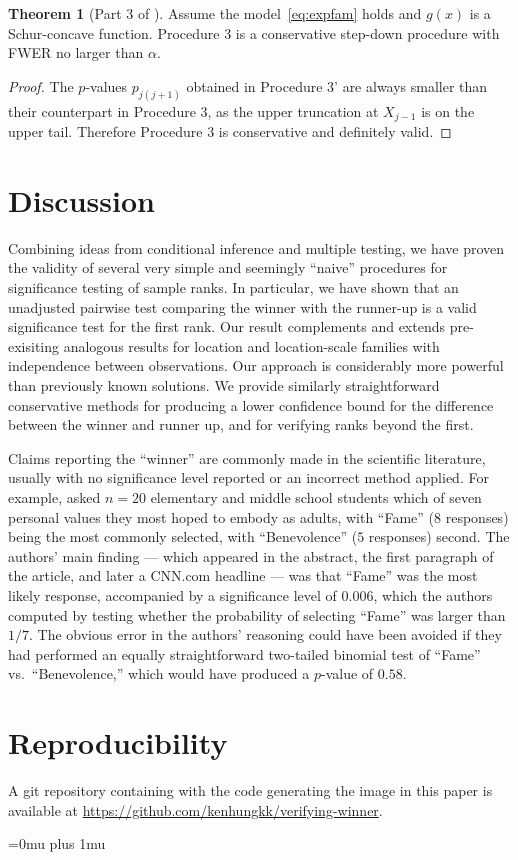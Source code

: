 \documentclass[11pt]{article}
\theoremstyle{definition}
\theoremstyle{custom}
\newtheorem*{customthm}{Theorem}
\begin{document}
\begin{customthm}[Part 3 of ]
Assume the model~\eqref{eq:expfam} holds and $g\left(x\right)$ is a Schur-concave function. Procedure 3 is a conservative step-down procedure with FWER no larger than $\alpha$.
\end{customthm}

\begin{proof}
The $p$-values $p_{j\left(j+1\right)}$ obtained in Procedure 3' are always smaller than their counterpart in Procedure 3, as the upper truncation at $X_{j-1}$ is on the upper tail. Therefore Procedure 3 is conservative and definitely valid.
\end{proof}

\section{Discussion}
\label{sec:disc}

Combining ideas from conditional inference and multiple testing, we have proven the validity of several very simple and seemingly ``naive'' procedures for significance testing of sample ranks. In particular, we have shown that an unadjusted pairwise test comparing the winner with the runner-up is a valid significance test for the first rank. Our result complements and extends pre-exisiting analogous results for location and location-scale families with independence between observations. Our approach is considerably more powerful than previously known solutions. We provide similarly straightforward conservative methods for producing a lower confidence bound for the difference between the winner and runner up, and for verifying ranks beyond the first.

Claims reporting the ``winner'' are commonly made in the scientific literature, usually with no significance level reported or an incorrect method applied. For example, \citet{Uhls:2012gf} asked $n = 20$ elementary and middle school students which of seven personal values they most hoped to embody as adults, with ``Fame'' ($8$ responses) being the most commonly selected, with ``Benevolence'' ($5$ responses) second. The authors' main finding --- which appeared in the abstract, the first paragraph of the article, and later a CNN.com headline \citep{Alikhani:2011} --- was that ``Fame'' was the most likely response, accompanied by a significance level of $0.006$, which the authors computed by testing whether the probability of selecting ``Fame'' was larger than $1 / 7$. The obvious error in the authors' reasoning could have been avoided if they had performed an equally straightforward two-tailed binomial test of ``Fame'' vs.\ ``Benevolence,'' which would have produced a $p$-value of $0.58$.

\section*{Reproducibility}
A git repository containing with the code generating the image in this paper is available at \url{https://github.com/kenhungkk/verifying-winner}.

\Urlmuskip=0mu plus 1mu\relax


\end{document}
